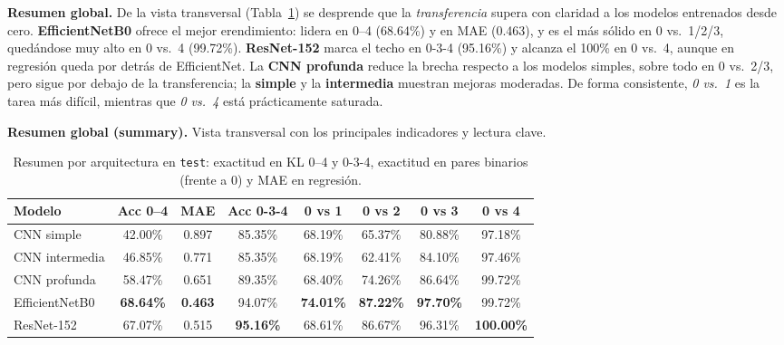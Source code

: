 \documentclass[11pt,spanish,listoffigures,listoftables]{tfgetsinf}
\begin{document}
\noindent\textbf{Resumen global.} De la vista transversal (Tabla~\ref{tab:resumen_global}) se desprende que la \emph{transferencia} supera con claridad a los modelos entrenados desde cero. \textbf{EfficientNetB0} ofrece el mejor erendimiento: lidera en 0--4 (68.64\%) y en MAE (0.463), y es el más sólido en 0 vs.\ 1/2/3, quedándose muy alto en 0 vs.\ 4 (99.72\%). \textbf{ResNet-152} marca el techo en 0-3-4 (95.16\%) y alcanza el 100\% en 0 vs.\ 4, aunque en regresión queda por detrás de EfficientNet. La \textbf{CNN profunda} reduce la brecha respecto a los modelos simples, sobre todo en 0 vs.\ 2/3, pero sigue por debajo de la transferencia; la \textbf{simple} y la \textbf{intermedia} muestran mejoras moderadas. De forma consistente, \emph{0 vs.\ 1} es la tarea más difícil, mientras que \emph{0 vs.\ 4} está prácticamente saturada.

\noindent\textbf{Resumen global (summary).} Vista transversal con los principales indicadores y lectura clave.
\begin{table}[H]
	\centering
	\caption{Resumen por arquitectura en \texttt{test}: exactitud en KL 0--4 y 0-3-4, exactitud en pares binarios (frente a 0) y MAE en regresión.}
	\label{tab:resumen_global}
	\begin{tabular}{lccccccc}
		\toprule
		\textbf{Modelo} & \textbf{Acc 0--4} & \textbf{MAE}   & \textbf{Acc 0-3-4} & \textbf{0 vs 1}  & \textbf{0 vs 2}  & \textbf{0 vs 3}  & \textbf{0 vs 4}   \\
		\midrule
		CNN simple      & 42.00\%           & 0.897          & 85.35\%            & 68.19\%          & 65.37\%          & 80.88\%          & 97.18\%           \\
		CNN intermedia  & 46.85\%           & 0.771          & 85.35\%            & 68.19\%          & 62.41\%          & 84.10\%          & 97.46\%           \\
		CNN profunda    & 58.47\%           & 0.651          & 89.35\%            & 68.40\%          & 74.26\%          & 86.64\%          & 99.72\%           \\
		EfficientNetB0  & \textbf{68.64\%}  & \textbf{0.463} & 94.07\%            & \textbf{74.01\%} & \textbf{87.22\%} & \textbf{97.70\%} & 99.72\%           \\
		ResNet-152      & 67.07\%           & 0.515          & \textbf{95.16\%}   & 68.61\%          & 86.67\%          & 96.31\%          & \textbf{100.00\%} \\
		\bottomrule
	\end{tabular}
\end{table}
\end{document}
